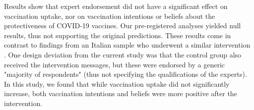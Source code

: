 \documentclass[authordate, empirical]{jote-new-article}
\begin{document}
	Results show that expert endorsement did not have a significant effect on vaccination uptake, nor on vaccination intentions or beliefs about the protectiveness of COVID-19 vaccines. Our pre-registered analyses yielded null results, thus not supporting the original predictions. These results come in contrast to findings from an Italian sample who underwent a similar intervention \parencites{Ronzani2022}. One design deviation from the current study was that the control group also received the intervention messages, but these were endorsed by a generic "majority of respondents" (thus not specifying the qualifications of the experts). In this study, we found that while vaccination uptake did not significantly increase, both vaccination intentions and beliefs were more positive after the intervention.
\end{document}
